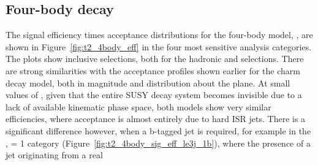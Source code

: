 \subsection{Four-body decay}
\label{sec:t2degen_eff}

The signal efficiency times acceptance distributions for the four-body model,
\Ttwodegen, are shown 
in Figure~\ref{fig:t2_4body_eff} in the four most sensitive analysis categories.
The plots show inclusive \HT selections, both for the hadronic and \mj
selections. There
are strong similarities with the acceptance profiles shown earlier for the
charm decay model,
both in magnitude and distribution about the plane. At small values of \deltam, 
given that the entire SUSY decay system becomes invisible due to a lack of 
available kinematic phase space, both models show very similar efficiencies,
where
acceptance is almost entirely due to hard ISR jets. There is a
significant difference however, when a b-tagged jet is required, for example in 
the \njlow, \nb= 1 category (Figure~\ref{fig:t2_4body_sig_eff_le3j_1b}), where
the presence of a jet originating from a real 
%
